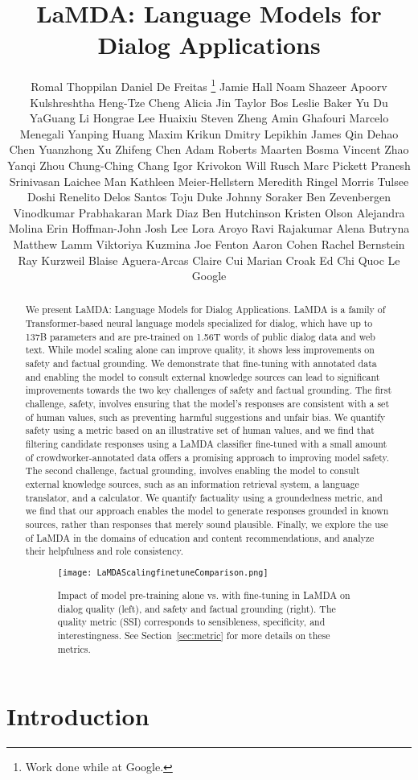 \documentclass{article}
\title{LaMDA: Language Models for Dialog Applications}
\author{
   Romal Thoppilan \vspace{-8ex} \And
   Daniel De Freitas \thanks{Work done while at Google.} \vspace{-8ex} \And
   Jamie Hall \vspace{-8ex} \And
   Noam Shazeer \footnotemark[1] \vspace{-8ex} \And
   Apoorv Kulshreshtha \vspace{-8ex} \And
   Heng-Tze Cheng \vspace{-8ex} \And
   Alicia Jin  \vspace{-8ex} \And
   Taylor Bos \vspace{-8ex} \And
   Leslie Baker \vspace{-8ex} \And
   Yu Du \vspace{-8ex} \And
   YaGuang Li \vspace{-8ex} \And
   Hongrae Lee \vspace{-8ex} \And
   Huaixiu Steven Zheng \vspace{-8ex} \And
   Amin Ghafouri \vspace{-8ex} \And 
   Marcelo Menegali \vspace{-8ex} \And
   Yanping Huang \vspace{-8ex} \And
   Maxim Krikun \vspace{-8ex} \And
   Dmitry Lepikhin \vspace{-8ex} \And
   James Qin \vspace{-8ex} \And
   Dehao Chen \vspace{-8ex} \And
   Yuanzhong Xu \vspace{-8ex} \And
   Zhifeng Chen \vspace{-8ex} \And
   Adam Roberts \vspace{-8ex} \And
   Maarten Bosma \vspace{-8ex} \And
   Vincent Zhao \vspace{-8ex} \And
   Yanqi Zhou \vspace{-8ex} \And
   Chung-Ching Chang \vspace{-8ex} \And
   Igor Krivokon \vspace{-8ex} \And
   Will Rusch \vspace{-8ex} \And
   Marc Pickett \vspace{-8ex} \And
   Pranesh Srinivasan \vspace{-8ex} \And
   Laichee Man \vspace{-8ex} \And
   Kathleen Meier-Hellstern \vspace{-8ex} \And
   Meredith Ringel Morris \vspace{-8ex} \And 
   Tulsee Doshi \vspace{-8ex} \And 
   Renelito Delos Santos \vspace{-8ex}\And
   Toju Duke \vspace{-8ex} \And
   Johnny Soraker \vspace{-8ex} \And
   Ben Zevenbergen \vspace{-8ex} \And
   Vinodkumar Prabhakaran \vspace{-8ex} \And 
   Mark Diaz \vspace{-8ex} \And
   Ben Hutchinson \vspace{-8ex} \And
   Kristen Olson \vspace{-8ex} \And
   Alejandra Molina \vspace{-8ex} \And
   Erin Hoffman-John \vspace{-8ex} \And
   Josh Lee \vspace{-8ex} \And
   Lora Aroyo \vspace{-8ex} \And
   Ravi Rajakumar \vspace{-8ex} \And
   Alena Butryna \vspace{-8ex} \And
   Matthew Lamm \vspace{-8ex} \And
   Viktoriya Kuzmina \vspace{-8ex} \And
   Joe Fenton \vspace{-8ex} \And
   Aaron Cohen \vspace{-8ex} \And
   Rachel Bernstein \vspace{-8ex} \And 
   Ray Kurzweil \vspace{-8ex} \And    
   Blaise Aguera-Arcas \vspace{-8ex} \And 
   Claire Cui \vspace{-8ex} \And 
   Marian Croak \vspace{-8ex} \And 
   Ed Chi \vspace{-8ex} \And 
   Quoc Le \vspace{-8ex} \AND
   \\ Google
}
\def\knowledgetool{information retrieval system\xspace}
\begin{document}
\maketitle

\begin{abstract}
  We present LaMDA: Language Models for Dialog Applications. LaMDA is a family of Transformer-based neural language models specialized for dialog, which have up to 137B parameters and are pre-trained on 1.56T words of public dialog data and web text. 
  While model scaling alone can improve quality, it shows less improvements on safety and factual grounding. We demonstrate that fine-tuning with annotated data and enabling the model to consult external knowledge sources can lead to significant improvements towards the two key challenges of safety and factual grounding.
  The first challenge, safety, involves ensuring that the model’s responses are consistent with a set of human values, such as preventing harmful suggestions and unfair bias. We quantify safety using a metric based on an illustrative set of human values, and we find that filtering candidate responses using a LaMDA classifier fine-tuned with a small amount of crowdworker-annotated data offers a promising approach to improving model safety. The second challenge, factual grounding, involves enabling the model to consult external knowledge sources, such as an \knowledgetool, a language translator, and a calculator. We quantify factuality using a groundedness metric, and we find that our approach enables the model to generate responses grounded in known sources, rather than responses that merely sound plausible. Finally, we explore  the use of LaMDA in the domains of education and content recommendations, and analyze their helpfulness and role consistency.

  
  \begin{figure}[h!]
    \centering
\texttt{[image: LaMDAScalingfinetuneComparison.png]}
    \caption{Impact of model pre-training alone vs. with fine-tuning in LaMDA on dialog quality (left), and safety and factual grounding (right). The quality metric (SSI) corresponds to sensibleness, specificity, and interestingness. See  Section~\ref{sec:metric} for more details on these metrics.}
    \label{fig:summary}
\end{figure}
\end{abstract}



\section{Introduction}
\end{document}
